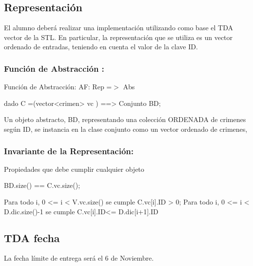 \hypertarget{index_rep}{}\subsection{Representación}\label{index_rep}
El alumno deberá realizar una implementación utilizando como base el T\+D\+A vector de la S\+T\+L. En particular, la representación que se utiliza es un vector ordenado de entradas, teniendo en cuenta el valor de la clave I\+D.\hypertarget{index_fact_sec2}{}\subsubsection{Función de Abstracción \+:}\label{index_fact_sec2}
Función de Abstracción\+: A\+F\+: Rep =$>$ Abs \begin{DoxyVerb}dado C =(vector<crimen> vc ) ==> Conjunto BD;
\end{DoxyVerb}


Un objeto abstracto, B\+D, representando una colección O\+R\+D\+E\+N\+A\+D\+A de crimenes según I\+D, se instancia en la clase conjunto como un vector ordenado de crimenes,\hypertarget{index_inv_sec2}{}\subsubsection{Invariante de la Representación\+:}\label{index_inv_sec2}
Propiedades que debe cumplir cualquier objeto


\begin{DoxyCode}
BD.size() == C.vc.size();

Para todo i, 0 <= i < V.vc.size() se cumple
    C.vc[i].ID > 0;
Para todo i, 0 <= i < D.dic.size()-1 se cumple
    C.vc[i].ID<= D.dic[i+1].ID
\end{DoxyCode}
\hypertarget{index_fecha}{}\subsection{T\+D\+A fecha}\label{index_fecha}
La fecha límite de entrega será el 6 de Noviembre. 